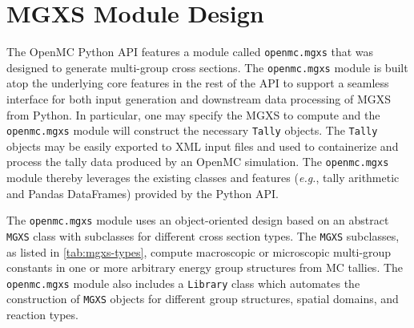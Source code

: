 \section{MGXS Module Design}
\label{sec:design}

The OpenMC Python API features a module called \texttt{openmc.mgxs} that was designed to generate multi-group cross sections. The \texttt{openmc.mgxs} module is built atop the underlying core features in the rest of the API to support a seamless interface for both input generation and downstream data processing of MGXS from Python. In particular, one may specify the MGXS to compute and the \texttt{openmc.mgxs} module will construct the necessary \texttt{Tally} objects. The \texttt{Tally} objects may be easily exported to XML input files and used to containerize and process the tally data produced by an OpenMC simulation. The \texttt{openmc.mgxs} module thereby leverages the existing classes and features (\textit{e.g.}, tally arithmetic and Pandas DataFrames) provided by the Python API.

The \texttt{openmc.mgxs} module uses an object-oriented design based on an abstract \texttt{MGXS} class with subclasses for different cross section types. The \texttt{MGXS} subclasses, as listed in \cref{tab:mgxs-types}, compute macroscopic or microscopic multi-group constants in one or more arbitrary energy group structures from MC tallies. The \texttt{openmc.mgxs} module also includes a \texttt{Library} class which automates the construction of \texttt{MGXS} objects for different group structures, spatial domains, and reaction types.

